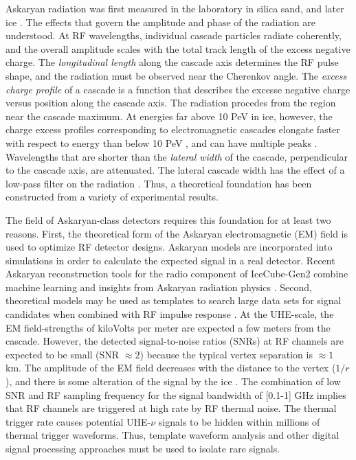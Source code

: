 \documentclass[amsmath,amssymb,aps,prd,10pt,twocolumn]{revtex4}
\begin{document}
Askaryan radiation was first measured in the laboratory in silica sand, and later ice \cite{saltzberg,10.1103/PhysRevD.74.043002,ask_ice}.  The effects that govern the amplitude and phase of the radiation are understood.  At RF wavelengths, individual cascade particles radiate coherently, and the overall amplitude scales with the total track length of the excess negative charge.  The \textit{longitudinal length} along the cascade axis determines the RF pulse shape, and the radiation must be observed near the Cherenkov angle.  The \textit{excess charge profile} of a cascade is a function that describes the excesse negative charge versus position along the cascade axis.  The radiation procedes from the region near the cascade maximum.  At energies far above 10 PeV in ice, however, the charge excess profiles corresponding to electromagnetic cascades elongate faster with respect to energy than below 10 PeV \cite{10.1103/physrevd.82.074017}, and can have multiple peaks \cite{10.1016/j.astropartphys.2009.06.005}.  Wavelengths that are shorter than the \textit{lateral width} of the cascade, perpendicular to the cascade axis, are attenuated.  The lateral cascade width has the effect of a low-pass filter on the radiation \cite{10.1016/j.astropartphys.2017.03.008}.  Thus, a theoretical foundation has been constructed from a variety of experimental results.

The field of Askaryan-class detectors requires this foundation for at least two reasons.  First, the theoretical form of the Askaryan electromagnetic (EM) field is used to optimize RF detector designs.  Askaryan models are incorporated into simulations \cite{dookayka2011characterizing,testbed,10.1140/epjc/s10052-020-7612-8} in order to calculate the expected signal in a real detector.  Recent Askaryan reconstruction tools for the radio component of IceCube-Gen2 combine machine learning and insights from Askaryan radiation physics \cite{10.1140/epjc/s10052-019-6971-5,10.1088/1748-0221/15/09/p09039,IFT}.  Second, theoretical models may be used as templates to search large data sets for signal candidates when combined with RF impulse response \cite{10.1088/1475-7516/2020/03/053,10.1016/j.astropartphys.2014.09.002}.  At the UHE-scale, the EM field-strengths of kiloVolts per meter are expected a few meters from the cascade.  However, the detected signal-to-noise ratios (SNRs) at RF channels are expected to be small (SNR  $\approx 2$) because the typical vertex separation is $\approx 1$ km.  The amplitude of the EM field decreases with the distance to the vertex ($1/r$), and there is some alteration of the signal by the ice \cite{10.3189/2015jog14j214,Barwick:2018497,ALLISON201963}.  The combination of low SNR and RF sampling frequency for the signal bandwidth of [0.1-1] GHz implies that RF channels are triggered at high rate by RF thermal noise.  The thermal trigger rate causes potential UHE-$\nu$ signals to be hidden within millions of thermal trigger waveforms.  Thus, template waveform analysis and other digital signal processing approaches must be used to isolate rare signals.
\end{document}
